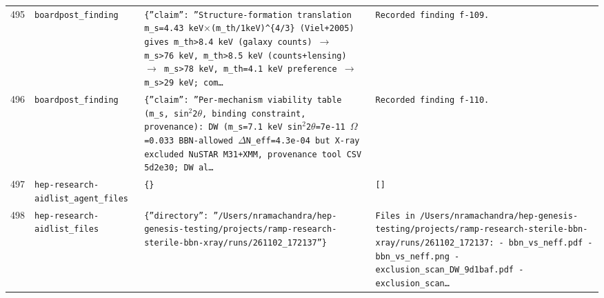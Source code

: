 \documentclass[11pt,a4paper]{article}
\begin{document}
\begin{longtable}{@{}p{}p{}p{}p{}@{}}
495 & \texttt{board}\newline\texttt{post\_\allowbreak{}finding} & \texttt{\{''claim'':\allowbreak{} ''Structure-formation translation m\_\allowbreak{}s=\allowbreak{}4.43 keV$\times$(m\_\allowbreak{}th/\allowbreak{}1keV)\allowbreak{}\textasciicircum{}\allowbreak{}\{4/\allowbreak{}3\}\allowbreak{} (Viel+2005)\allowbreak{} gives m\_\allowbreak{}th\textgreater{}\allowbreak{}8.4 keV (galaxy counts)\allowbreak{} $\to$ m\_\allowbreak{}s\textgreater{}\allowbreak{}76 keV,\allowbreak{} m\_\allowbreak{}th\textgreater{}\allowbreak{}8.5 keV (counts+lensing)\allowbreak{} $\to$ m\_\allowbreak{}s\textgreater{}\allowbreak{}78 keV,\allowbreak{} m\_\allowbreak{}th=\allowbreak{}4.1 keV preference $\to$ m\_\allowbreak{}s\textgreater{}\allowbreak{}29 keV;\allowbreak{} com\ldots{}\allowbreak{}} & \texttt{Recorded finding f-109.} \\
496 & \texttt{board}\newline\texttt{post\_\allowbreak{}finding} & \texttt{\{''claim'':\allowbreak{} ''Per-mechanism viability table (m\_\allowbreak{}s,\allowbreak{} sin$^2$2$\theta$,\allowbreak{} binding constraint,\allowbreak{} provenance)\allowbreak{}:\allowbreak{} DW (m\_\allowbreak{}s=\allowbreak{}7.1 keV sin$^2$2$\theta$=\allowbreak{}7e-11 $\Omega$=\allowbreak{}0.033 BBN-allowed $\Delta$N\_\allowbreak{}eff=\allowbreak{}4.3e-04 but X-ray excluded NuSTAR M31+XMM,\allowbreak{} provenance tool CSV 5d2e30;\allowbreak{} DW al\ldots{}\allowbreak{}} & \texttt{Recorded finding f-110.} \\
497 & \texttt{hep-research-aid}\newline\texttt{list\_\allowbreak{}agent\_\allowbreak{}files} & \texttt{\{\}\allowbreak{}} & \texttt{[]\allowbreak{}} \\
498 & \texttt{hep-research-aid}\newline\texttt{list\_\allowbreak{}files} & \texttt{\{''directory'':\allowbreak{} ''/\allowbreak{}Users/\allowbreak{}nramachandra/\allowbreak{}hep-genesis-testing/\allowbreak{}projects/\allowbreak{}ramp-research-sterile-bbn-xray/\allowbreak{}runs/\allowbreak{}261102\_\allowbreak{}172137''\}\allowbreak{}} & \texttt{Files in /\allowbreak{}Users/\allowbreak{}nramachandra/\allowbreak{}hep-genesis-testing/\allowbreak{}projects/\allowbreak{}ramp-research-sterile-bbn-xray/\allowbreak{}runs/\allowbreak{}261102\_\allowbreak{}172137:\allowbreak{}   - bbn\_\allowbreak{}vs\_\allowbreak{}neff.pdf   - bbn\_\allowbreak{}vs\_\allowbreak{}neff.png   - exclusion\_\allowbreak{}scan\_\allowbreak{}DW\_\allowbreak{}9d1baf.pdf   - exclusion\_\allowbreak{}scan\ldots{}\allowbreak{}} \\

\end{longtable}
\end{document}
